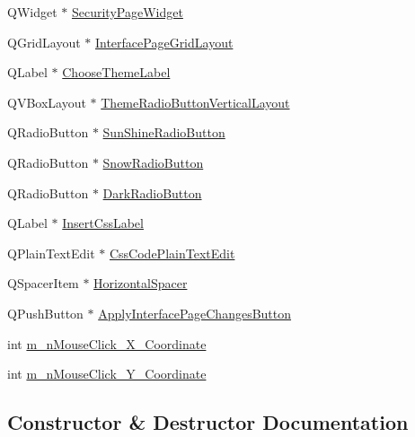 \begin{DoxyCompactItemize}
\item 
Q\+Widget $\ast$ \hyperlink{class_matty_settings_dialog_a73e2049874e44a3ef9249942fe276be5}{Security\+Page\+Widget}
\item 
Q\+Grid\+Layout $\ast$ \hyperlink{class_matty_settings_dialog_ad2b26a023e7e9541c34c4e1aba800a8e}{Interface\+Page\+Grid\+Layout}
\item 
Q\+Label $\ast$ \hyperlink{class_matty_settings_dialog_acd28094d640ba4cca05c8b23e00b3a59}{Choose\+Theme\+Label}
\item 
Q\+V\+Box\+Layout $\ast$ \hyperlink{class_matty_settings_dialog_a2b7a07510ef76c1161d247437e0a39c0}{Theme\+Radio\+Button\+Vertical\+Layout}
\item 
Q\+Radio\+Button $\ast$ \hyperlink{class_matty_settings_dialog_a58a1d3e1f6837337e641854d89e08317}{Sun\+Shine\+Radio\+Button}
\item 
Q\+Radio\+Button $\ast$ \hyperlink{class_matty_settings_dialog_a0311fa433fe036e18ea683a4f256098b}{Snow\+Radio\+Button}
\item 
Q\+Radio\+Button $\ast$ \hyperlink{class_matty_settings_dialog_a118d63e6468ca5d5b2bbb68241e3bae5}{Dark\+Radio\+Button}
\item 
Q\+Label $\ast$ \hyperlink{class_matty_settings_dialog_aed8d05ed2c013c77b15b0a22d0a3b604}{Insert\+Css\+Label}
\item 
Q\+Plain\+Text\+Edit $\ast$ \hyperlink{class_matty_settings_dialog_a9e655435f2bcca518d5a9b8ae6244257}{Css\+Code\+Plain\+Text\+Edit}
\item 
Q\+Spacer\+Item $\ast$ \hyperlink{class_matty_settings_dialog_a83bd6a20a2ce05082e4258c82d8a82cb}{Horizontal\+Spacer}
\item 
Q\+Push\+Button $\ast$ \hyperlink{class_matty_settings_dialog_aacdb8eada43f929ba854e06a6311f714}{Apply\+Interface\+Page\+Changes\+Button}
\item 
int \hyperlink{class_matty_settings_dialog_a0a19e3bafbfb97c643edfa372dd01795}{m\+\_\+n\+Mouse\+Click\+\_\+\+X\+\_\+\+Coordinate}
\item 
int \hyperlink{class_matty_settings_dialog_a7e437ff929a372a8a9bccdb8d3463b10}{m\+\_\+n\+Mouse\+Click\+\_\+\+Y\+\_\+\+Coordinate}
\end{DoxyCompactItemize}


\subsection{Constructor \& Destructor Documentation}
